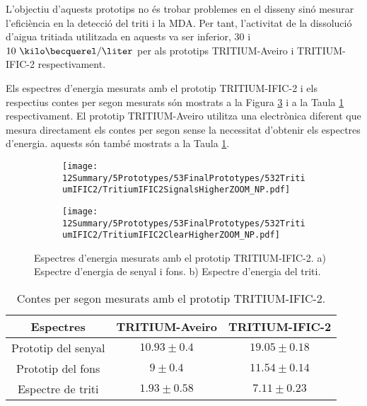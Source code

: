 L'objectiu d'aquests prototips no és trobar problemes en el disseny sinó mesurar l'eficiència en la detecció del triti i la MDA. Per tant, l'activitat de la dissolució d'aigua tritiada utilitzada en aquests va ser inferior, $30$ i $10~\kilo\becquerel/\liter$ per als prototips TRITIUM-Aveiro i TRITIUM-IFIC-2 respectivament.

Els espectres d'energia mesurats amb el prototip TRITIUM-IFIC-2 i els respectius contes per segon mesurats són  mostrats a la Figura \ref{fig:EspectresEnergeticsTRITIUMIFIC2} i a la Taula \ref{tab:ContesPerSegonTRITIUMIFIC2} respectivament. El prototip TRITIUM-Aveiro utilitza una electrònica diferent que mesura directament els contes per segon sense la necessitat d'obtenir els espectres d'energia. aquests són també mostrats a la Taula \ref{tab:ContesPerSegonTRITIUMIFIC2}.

\begin{figure}
\centering
    \begin{subfigure}[b]{1\textwidth}
    \centering
    \texttt{[image: 12Summary/5Prototypes/53FinalPrototypes/532TritiumIFIC2/TritiumIFIC2SignalsHigherZOOM\_NP.pdf]}  
    \caption{\label{subfig:EspectreEnergeticSenyalFonsTritiumIFIC2}}
    \end{subfigure}
    \hfill
    \begin{subfigure}[b]{1\textwidth}
    \centering
    \texttt{[image: 12Summary/5Prototypes/53FinalPrototypes/532TritiumIFIC2/TritiumIFIC2ClearHigherZOOM\_NP.pdf]}  
    \caption{\label{subfig:EspectreEnergeticTritiTritiumIFIC2}}
    \end{subfigure}
 \caption{Espectres d'energia mesurats amb el prototip TRITIUM-IFIC-2. a) Espectre d'energia de senyal i fons. b) Espectre d'energia del triti.}
 \label{fig:EspectresEnergeticsTRITIUMIFIC2}
\end{figure}

\begin{table}[htbp]
\centering{}%
\begin{tabular}{ccc}
\toprule 
Espectres & TRITIUM-Aveiro & TRITIUM-IFIC-2  \tabularnewline
\midrule
\midrule 
Prototip del senyal & $10.93 \pm 0.4$ & $19.05 \pm 0.18$ \tabularnewline
Prototip del fons & $9 \pm 0.4$ & $11.54 \pm 0.14$ \tabularnewline  
Espectre de triti & $1.93 \pm 0.58$ & $7.11 \pm 0.23$ \tabularnewline
\bottomrule
\end{tabular}
\caption{Contes per segon mesurats amb el prototip TRITIUM-IFIC-2.}
\label{tab:ContesPerSegonTRITIUMIFIC2}
\end{table}

